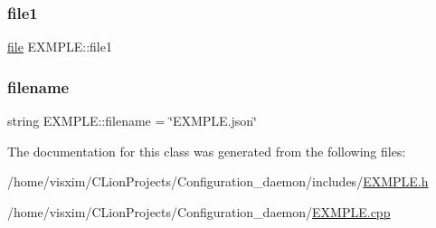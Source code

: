 \subsubsection{\texorpdfstring{file1}{file1}}
{\footnotesize\ttfamily \hyperlink{classfile}{file} E\+X\+M\+P\+L\+E\+::file1}

\mbox{\label{classEXMPLE_a32f76326cf2b42a51b023b090f210289}} 
\subsubsection{\texorpdfstring{filename}{filename}}
{\footnotesize\ttfamily string E\+X\+M\+P\+L\+E\+::filename = \char`\"{}E\+X\+M\+P\+L\+E.\+json\char`\"{}\hspace{0.3cm}{\ttfamily [private]}}



The documentation for this class was generated from the following files\+:\begin{DoxyCompactItemize}
\item 
/home/visxim/\+C\+Lion\+Projects/\+Configuration\+\_\+daemon/includes/\hyperlink{EXMPLE_8h}{E\+X\+M\+P\+L\+E.\+h}\item 
/home/visxim/\+C\+Lion\+Projects/\+Configuration\+\_\+daemon/\hyperlink{EXMPLE_8cpp}{E\+X\+M\+P\+L\+E.\+cpp}\end{DoxyCompactItemize}
